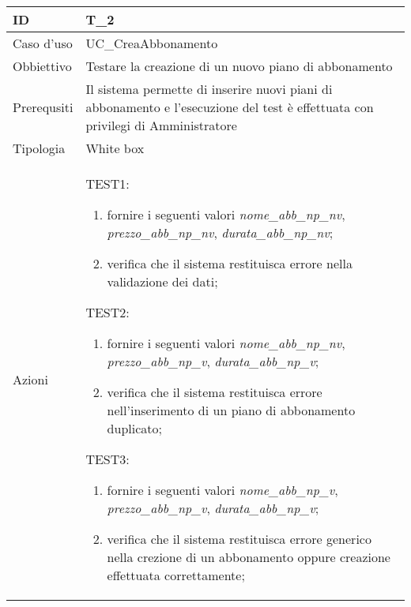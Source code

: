 \begin{table}[hb]
    \centering
    \begin{tabular}{ |p{2cm}|p{10cm}|  }
        \hline
        ID          & T\_2                                                                                                                            \\\hline
        Caso d'uso  & UC\_CreaAbbonamento                                                                                                             \\\hline
        Obbiettivo  & Testare la creazione di un nuovo piano di abbonamento                                                                           \\\hline
        Prerequsiti & Il sistema permette di inserire nuovi piani di abbonamento e l'esecuzione del test è effettuata con privilegi di Amministratore \\\hline
        Tipologia   & White box                                                                                                                       \\\hline
        Azioni      &
        TEST1:
        \begin{enumerate}[nosep, topsep=0pt]
            \item fornire i seguenti valori \emph{nome\_abb\_np\_nv}, \emph{prezzo\_abb\_np\_nv}, \emph{durata\_abb\_np\_nv};
            \item verifica che il sistema restituisca errore nella validazione dei dati;
        \end{enumerate}
        \vspace{0.5cm} TEST2:
        \begin{enumerate}[nosep, topsep=0pt]
            \item fornire i seguenti valori \emph{nome\_abb\_np\_nv}, \emph{prezzo\_abb\_np\_v}, \emph{durata\_abb\_np\_v};
            \item verifica che il sistema restituisca errore nell'inserimento di un piano di abbonamento duplicato;
        \end{enumerate}
        \vspace{0.5cm} TEST3:
        \begin{enumerate}[nosep, topsep=0pt]
            \item fornire i seguenti valori \emph{nome\_abb\_np\_v}, \emph{prezzo\_abb\_np\_v}, \emph{durata\_abb\_np\_v};
            \item verifica che il sistema restituisca errore generico nella crezione di un abbonamento oppure creazione effettuata correttamente;
        \end{enumerate}
        \\\hline
    \end{tabular}
\end{table}

